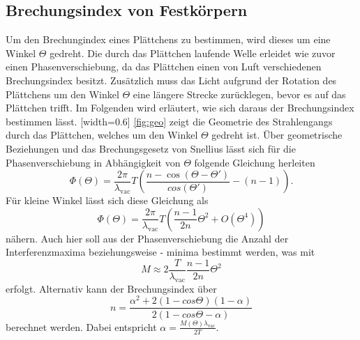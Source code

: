 \subsection{Brechungsindex von Festkörpern}
Um den Brechungindex eines Plättchens zu bestimmen, wird dieses um eine Winkel $\Theta$ gedreht. Die durch das Plättchen laufende Welle erleidet wie zuvor einen Phasenverschiebung, da das Plättchen einen von Luft verschiedenen Brechungsindex besitzt. Zusätzlich muss das Licht aufgrund der Rotation des Plättchens um den Winkel $\Theta$ eine längere Strecke zurücklegen, bevor es auf das Plättchen trifft. Im Folgenden wird erläutert, wie sich daraus der Brechungsindex bestimmen lässt.
[width=0.6\textwidth]
\autoref{fig:geo} zeigt die Geometrie des Strahlengangs durch das Plättchen, welches um den Winkel $\Theta$ gedreht ist. Über geometrische Beziehungen und das Brechungsgesetz von Snellius lässt sich für die Phasenverschiebung in Abhängigkeit von $\Theta$ folgende Gleichung herleiten
\begin{equation}
  \Phi(\Theta) = \frac{2\pi}{\lambda_\mathrm{vac}}T \left( \frac{n-\cos(\Theta-\Theta')}{cos(\Theta')} - (n-1)\right).
\end{equation}
Für kleine Winkel lässt sich diese Gleichung als
\begin{equation}
  \Phi(\Theta) = \frac{2\pi}{\lambda_\mathrm{vac}}T\left(\frac{n-1}{2n}\Theta^2+O(\Theta^4)\right)
\end{equation}
nähern. Auch hier soll aus der Phasenverschiebung die Anzahl der Interferenzmaxima beziehungsweise - minima bestimmt werden, was mit
\begin{equation}
  \label{eqn:glas}
  M \approx 2 \frac{T}{\lambda_\mathrm{vac}}\frac{n-1}{2n}\Theta^2
\end{equation}
erfolgt. Alternativ kann der Brechungsindex über
\begin{equation}
  n = \frac{\alpha^2+2(1-cos\Theta)(1-\alpha)}{2(1-cos\Theta -\alpha)}
\end{equation}
berechnet werden. Dabei entspricht $\alpha = \frac{M(\Theta)\lambda_\mathrm{vac}}{2T}$.
